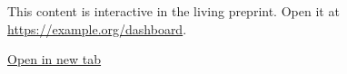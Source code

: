 \begin{tcolorbox}[colback=blue!5!white,colframe=blue!75!black,title={Interactive dashboard}]

\begin{tcolorbox}[colback=red!5!white,colframe=red!75!black,title={Interactive content}]

This content is interactive in the living preprint. Open it at \url{https://example.org/dashboard}.

\end{tcolorbox}

\href{https://example.org/dashboard}{Open in new tab}

\end{tcolorbox}

